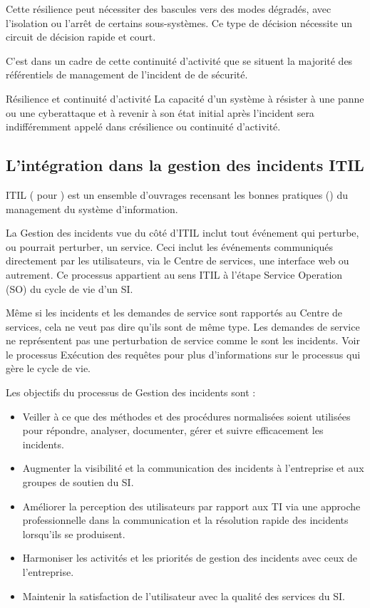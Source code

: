  Cette résilience peut  nécessiter des bascules vers des modes dégradés, avec l'isolation ou l'arrêt de certains sous-systèmes. Ce type de décision nécessite un circuit de décision rapide et court.

C'est dans un cadre de cette continuité d'activité que se situent la majorité des référentiels de management de l'incident de de sécurité.

\begin{notebox}{Résilience et continuité d'activité}
La capacité d’un système  à résister à une panne ou une cyberattaque et à revenir à son état initial après l’incident sera indifféremment appelé dans c\ecours résilience ou continuité d'activité. 
\end{notebox}


\subsection{L'intégration dans la gestion des incidents ITIL}

ITIL ( pour ) est un ensemble d'ouvrages recensant les bonnes pratiques () du management du système d'information. 

La Gestion des incidents vue du côté d'ITIL  inclut tout événement qui perturbe, ou pourrait perturber, un service. Ceci inclut les événements communiqués directement par les utilisateurs, via le Centre de services, une interface web ou autrement.
Ce processus appartient au sens ITIL à l'étape Service Operation (SO) du cycle de vie d'un SI.

Même si les incidents et les demandes de service sont rapportés au Centre de services, cela ne veut pas dire qu'ils sont de même type. Les demandes de service ne représentent pas une perturbation de service comme le sont les incidents. Voir le processus Exécution des requêtes pour plus d'informations sur le processus qui gère le cycle de vie. 

Les objectifs du processus de Gestion des incidents sont :

\begin{itemize}
  \item Veiller à ce que des méthodes et des procédures normalisées soient utilisées pour répondre, analyser, documenter, gérer et suivre efficacement les incidents.
  \item  Augmenter la visibilité et la communication des incidents à l'entreprise et aux groupes de soutien du SI.
  \item  Améliorer la perception des utilisateurs par rapport aux TI via une approche professionnelle dans la communication et la résolution rapide des incidents lorsqu'ils se produisent.
  \item Harmoniser les activités et les priorités de gestion des incidents avec ceux de l'entreprise.
  \item Maintenir la satisfaction de l'utilisateur avec la qualité des services du SI.
\end{itemize}

